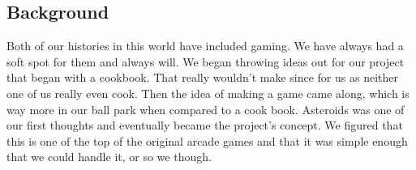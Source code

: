 \documentclass[10pt,conference,onecolumn,compsoc]{IEEEtran}
\begin{document}
%



\subsection{Background}
Both of our histories in this world have included gaming. We have always had a soft spot for them and always will. We began throwing ideas out for our project that began with a cookbook. That really wouldn't make since for us as neither one of us really even cook. Then the idea of making a game came along, which is way more in our ball park when compared to a cook book. Asteroids was one of our first thoughts and eventually became the project's concept. We figured that this is one of the top of the original arcade games and that it was simple enough that we could handle it, or so we though.
\end{document}
